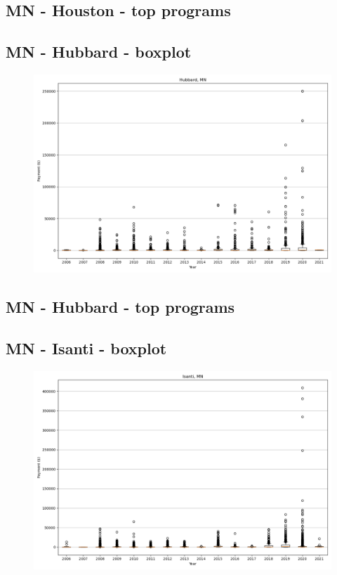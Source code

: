 \subsection*{MN - Houston - top programs}

\newpage
\subsection*{MN - Hubbard - boxplot}
\begin{figure}[h]
\centering
\includegraphics[width=7in]{../output/boxplots/counties/Hubbard-MN_boxplot.png}
\end{figure}


\subsection*{MN - Hubbard - top programs}

\newpage
\subsection*{MN - Isanti - boxplot}
\begin{figure}[h]
\centering
\includegraphics[width=7in]{../output/boxplots/counties/Isanti-MN_boxplot.png}
\end{figure}


